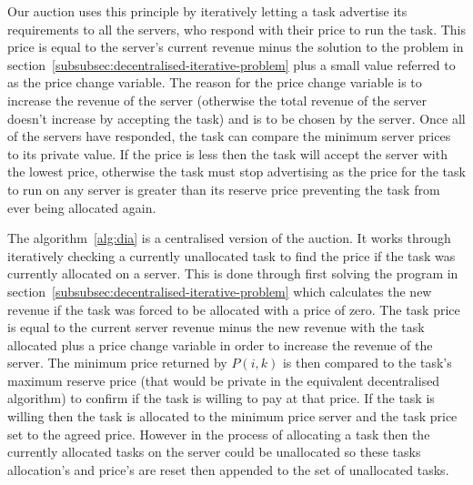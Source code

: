Our auction uses this principle by iteratively letting a task advertise its requirements to all the servers, who
respond with their price to run the task. This price is equal to the server's current revenue minus the solution to the
problem in section~\ref{subsubsec:decentralised-iterative-problem} plus a small value referred to as the price change
variable. The reason for the price change variable is to increase the revenue of the server (otherwise the total
revenue of the server doesn't increase by accepting the task) and is to be chosen by the server. Once all of the servers
have responded, the task can compare the minimum server prices to its private value. If the price is less then the
task will accept the server with the lowest price, otherwise the task must stop advertising as the price for the task
to run on any server is greater than its reserve price preventing the task from ever being allocated again.

The algorithm~\ref{alg:dia} is a centralised version of the auction. It works through iteratively checking a currently
unallocated task to find the price if the task was currently allocated on a server. This is done through first solving
the program in section~\ref{subsubsec:decentralised-iterative-problem} which calculates the new revenue if the task was
forced to be allocated with a price of zero. The task price is equal to the current server revenue minus the new
revenue with the task allocated plus a price change variable in order to increase the revenue of the server. The
minimum price returned by $P(i, k)$ is then compared to the task's maximum reserve price (that would be private in the
equivalent decentralised algorithm) to confirm if the task is willing to pay at that price. If the task is willing then
the task is allocated to the minimum price server and the task price set to the agreed price. However in the process of
allocating a task then the currently allocated tasks on the server could be unallocated so these tasks allocation's and
price's are reset then appended to the set of unallocated tasks.

